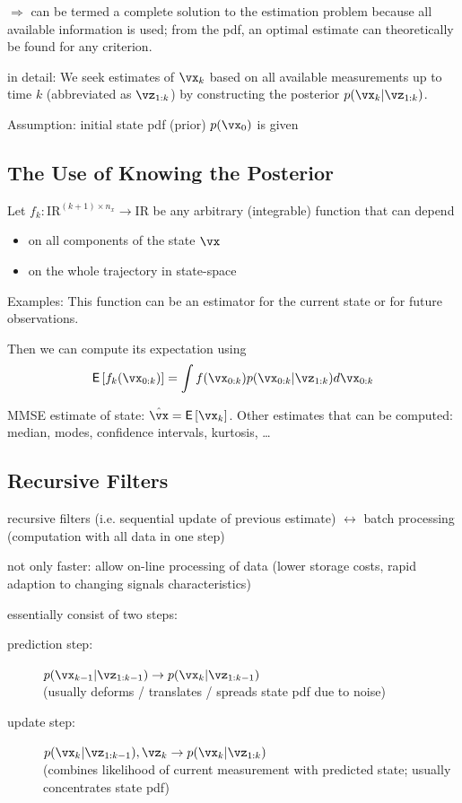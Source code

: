\documentclass[english,pdftex]{article}
\newcommand{\Realnumbers}{\mathrm{I\!R}}
\newcommand{\Expect}[1]{\mbox{{\sf E}}\left[ #1 \right]}
\begin{document}
$\Rightarrow$ can be termed a complete solution to the estimation
problem because all available information is used; from the pdf,
an optimal estimate can theoretically be found for any criterion.

in detail: We seek estimates of $\vx_k$ based on all available
measurements up to time $k$ (abbreviated as $\vz_{1:k}$) by
constructing the posterior $p(\vx_k|\vz_{1:k})$.

Assumption: initial state pdf (prior) $p(\vx_0)$ is given



\newpage
\subsection{The Use of Knowing the Posterior}

Let $f_k : \Realnumbers^{(k+1)\times n_x} \to \Realnumbers$ be any
arbitrary (integrable) function that can depend
\begin{itemize}
  \item on all components of the state $\vx$
  \item on the whole trajectory in state-space
\end{itemize}

Examples: This function can be an estimator for the current state
or for future observations.

Then we can compute its expectation using
\[
    \Expect{f_k(\vx_{0:k})} = \int f(\vx_{0:k})
    p(\vx_{0:k}|\vz_{1:k}) d\vx_{0:k}
\]

MMSE estimate of state: $\hat{\vx} = \Expect{\vx_k}$. Other
estimates that can be computed: median, modes, confidence
intervals, kurtosis, \dots



\newpage
\subsection{Recursive Filters}

recursive filters (i.e. sequential update of previous estimate)
$\leftrightarrow$ batch processing (computation with all data in
one step)

not only faster: allow on-line processing of data (lower storage
costs, rapid adaption to changing signals characteristics)

essentially consist of two steps:
 \begin{description}
 \item[prediction step:] $p(\vx_{k-1}|\vz_{1:k-1}) \to
 p(\vx_{k}|\vz_{1:k-1})$ \\
 (usually deforms / translates / spreads state pdf due to noise)
 \item[update step:] $p(\vx_{k}|\vz_{1:k-1}),\vz_k \to p(\vx_{k}|\vz_{1:k})$\\
 (combines likelihood of current measurement with predicted state;
 usually concentrates state pdf)
 \end{description}
\end{document}
